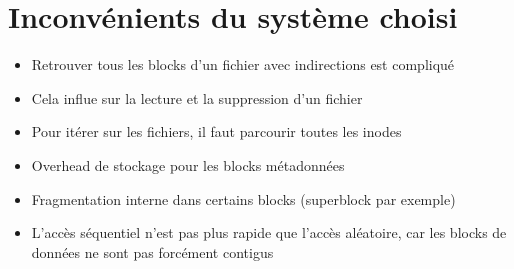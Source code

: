 \documentclass{article}
\begin{document}
\section{Inconvénients du système choisi}
\begin{itemize}
	\item Retrouver tous les blocks d'un fichier avec indirections est compliqué
	\item Cela influe sur la lecture et la suppression d'un fichier
	\item Pour itérer sur les fichiers, il faut parcourir toutes les inodes
	\item Overhead de stockage pour les blocks métadonnées
	\item Fragmentation interne dans certains blocks (superblock par exemple)
	\item L'accès séquentiel n'est pas plus rapide que l'accès aléatoire, car les blocks de données ne sont pas forcément contigus
\end{itemize}
\end{document}
